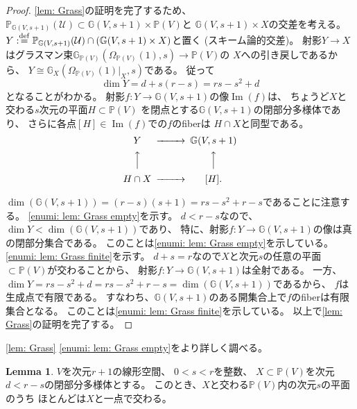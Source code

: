 \documentclass[uplatex]{jsarticle}
\theoremstyle{definition}
\newtheorem{lem}[lem]{Lemma}
\DeclareMathOperator{\im}{\mathrm{Im}}
\newcommand{\G}{\mathbb{G}}
\renewcommand{\P}{\mathbb{P}}
\newcommand{\mcU}{\mathcal{U}}
\newcommand{\dfn}{:\overset{\mathrm{\scriptsize def}}{=}}
\begin{document}
\begin{proof}
  \autoref{lem: Grass}の証明を完了するため、
  \(\P_{\G(V,s+1)}(\mcU)\subset \G(V,s+1)\times \P(V)\)と
  \(\G(V,s+1)\times X\)の交差を考える。
  \(Y \dfn \P_{\G(V,s+1)}(\mcU) \cap (\G(V,s+1)\times X)\)と置く
  (スキーム論的交差)。
  射影\(Y\to X\)はグラスマン束\(\G_{\P(V)}(\Omega_{\P(V)}(1),s)\to \P(V)\)の
  \(X\)への引き戻しであるから、
  \(Y\cong \G_X(\Omega_{\P(V)}(1)|_X,s)\)である。
  従って
  \[\dim Y = d + s(r-s) = rs-s^2+d\]
  となることがわかる。
  射影\(f:Y\to \G(V,s+1)\)の像\(\im(f)\)は、
  ちょうど\(X\)と交わる\(s\)次元の平面\(H \subset \P(V)\)
  を閉点とする\(\G(V,s+1)\)の閉部分多様体であり、
  さらに各点\([H]\in \im (f)\)での\(f\)のfiberは
  \(H\cap X\)と同型である。
  \[
  \begin{CD}
    Y @>>> \G(V,s+1) \\
    @AAA @AAA \\
    H\cap X @>>> [H].
  \end{CD}
  \]

  \(\dim (\G(V,s+1)) = (r-s)(s+1) = rs-s^2+r-s\)であることに注意する。
  \ref{enumi: lem: Grass empty}を示す。
  \(d< r-s\)なので、
  \(\dim Y < \dim(\G(V,s+1))\)であり、
  特に、射影\(f:Y\to \G(V,s+1)\)の像は真の閉部分集合である。
  このことは\ref{enumi: lem: Grass empty}を示している。
  \ref{enumi: lem: Grass finite}を示す。
  \(d+s=r\)なので\(X\)と次元\(s\)の任意の平面\(\subset \P(V)\)が交わることから、
  射影\(f:Y\to \G(V,s+1)\)は全射である。
  一方、\(\dim Y = rs-s^2+d = rs-s^2+r-s = \dim(\G(V,s+1))\)であるから、
  \(f\)は生成点で有限である。
  すなわち、\(\G(V,s+1)\)のある開集合上で\(f\)のfiberは有限集合となる。
  このことは\ref{enumi: lem: Grass finite}を示している。
  以上で\autoref{lem: Grass}の証明を完了する。
\end{proof}


\autoref{lem: Grass} \ref{enumi: lem: Grass empty}をより詳しく調べる。

\begin{lem}\label{lem: Grass 1pt}
  \(V\)を次元\(r+1\)の線形空間、
  \(0 < s < r\)を整数、
  \(X\subset \P(V)\)を次元\(d < r-s\)の閉部分多様体とする。
  このとき、\(X\)と交わる\(\P(V)\)内の次元\(s\)の平面のうち
  ほとんどは\(X\)と一点で交わる。
\end{lem}
\end{document}
